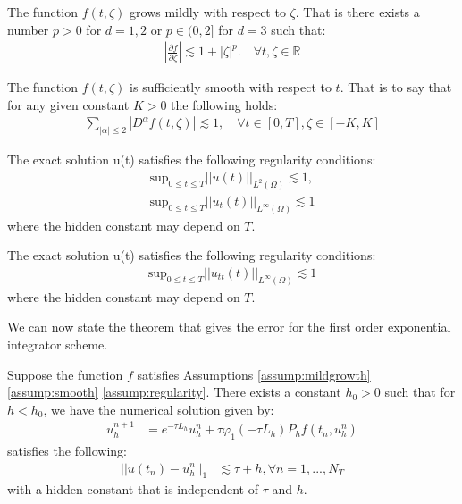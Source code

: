\begin{assumption}\label{assump:mildgrowth}
    The function $f(t,\zeta)$ grows mildly with respect to $\zeta$.
    That is there exists a number $p>0$ for $d=1,2$ or $p\in(0,2]$ for $d=3$ such that:
    \begin{align*}
        |\frac{\partial f}{\partial \zeta}| \lesssim 1 + |\zeta|^p. \quad \forall t,\zeta \in \mathbb{R}
    \end{align*}
\end{assumption}
\begin{assumption}\label{assump:smooth}
    The function $f(t, \zeta)$ is sufficiently smooth with respect to $t$.
    That is to say that for any given constant $K>0$ the following holds:
    \begin{align*}
        \sum_{|\alpha|\leq2}|D^{\alpha}f(t,\zeta)|\lesssim 1, \quad \forall t\in [0,T], \zeta \in[-K,K]
    \end{align*}
\end{assumption}
\begin{assumption}\label{assump:regularity}
    The exact solution u(t) satisfies the following regularity conditions:
    \begin{align*}
        \text{sup}_{0\leq t \leq T}||u(t)||_{L^2(\Omega)} \lesssim 1,\\
        \text{sup}_{0\leq t \leq T}||u_t(t)||_{L^\infty(\Omega)} \lesssim 1
    \end{align*}
    where the hidden constant may depend on $T$.
\end{assumption}
\begin{assumption}\label{assump:regularity2}
    The exact solution u(t) satisfies the following regularity conditions:
    \begin{align*}
        \text{sup}_{0\leq t \leq T}||u_{tt}(t)||_{L^\infty(\Omega)} \lesssim 1
    \end{align*}
    where the hidden constant may depend on $T$.
\end{assumption}

We can now state the theorem that gives the error for the first order exponential integrator scheme.
\begin{theorem}\label{theorem:standard1}
    Suppose the function $f$ satisfies Assumptions \ref{assump:mildgrowth} \ref{assump:smooth} \ref{assump:regularity}.
    There exists a constant $h_0 > 0$ such that for $h<h_0$, we have the numerical solution given by:
    \begin{align*}
        u_h^{n+1} &= e^{-\tau L_h}u_h^n + \tau \varphi_1(-\tau L_h)P_hf(t_n,u_h^n)
    \end{align*}
    satisfies the following:
    \begin{align*}
        ||u(t_n) - u_h^n||_1 &\lesssim \tau + h, \forall n =1,...,N_T
    \end{align*}
    with a hidden constant that is independent of $\tau$ and $h$.
\end{theorem}

